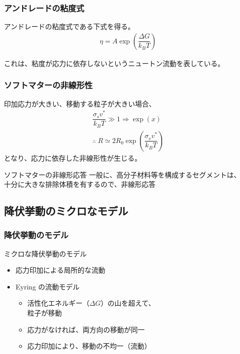 \documentclass[1４pt, dvipdfmx]{beamer}
\begin{document}
\begin{frame}
	\frametitle{アンドレードの粘度式}
	\large
	アンドレードの粘度式である下式を得る。
	\begin{align*}
	\eta = A \exp \left(\dfrac{\Delta G}{k_BT} \right)
	\end{align*}
	
	\large
	これは、粘度が応力に依存しないというニュートン流動を表している。
	
	\end{frame}
\begin{frame}
\frametitle{ソフトマターの非線形性}
\large
印加応力が大きい、移動する粒子が大きい場合、
\normalsize
\begin{align*}
\dfrac{\sigma_s v^*}{k_BT} \gg 1 \Rightarrow \exp(x) \\
\therefore \; R \simeq 2 R_0 \exp \left( \dfrac{ \sigma_s v^*}{k_BT} \right)
\end{align*}
\large
となり、応力に依存した非線形性が生じる。

\begin{alertblock}{ソフトマターの非線形応答}
一般に、高分子材料等を構成するセグメントは、\\
十分に大きな排除体積を有するので、非線形応答
\end{alertblock}

\end{frame}

\subsection{降伏挙動のミクロなモデル}

\begin{frame}
\frametitle{降伏挙動のモデル}

\Large
\begin{exampleblock}{ミクロな降伏挙動のモデル}
\begin{itemize}
\item
応力印加による局所的な流動
\item
Eyring の流動モデル
	\begin{itemize}
	\large
	\item
	活性化エネルギー（$\Delta G$）の山を超えて、\\粒子が移動
	\item
	応力がなければ、両方向の移動が同一
	\item
	応力印加により、移動の不均一（流動）
	\end{itemize}
\end{itemize}
\end{exampleblock}
\end{frame}
\end{document}
